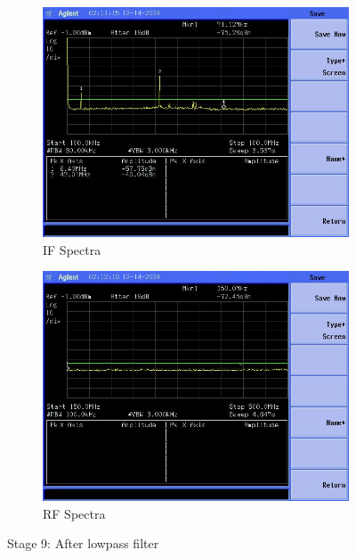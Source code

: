 \documentclass[letterpaper,12pt]{article}
\begin{document}
\begin{figure}[H]
	\begin{subfigure}[t]{.49\textwidth}
		\centering
		\includegraphics[width=\linewidth]{figures/receiver_spectra/9.lpf.lower}
		\caption{IF Spectra}
	  \end{subfigure}
	  \hfill
	  \begin{subfigure}[t]{.49\textwidth}
		\centering
		\includegraphics[width=\linewidth]{figures/receiver_spectra/9.lpf.upper}
		\caption{RF Spectra}
	  \end{subfigure}

	  \vspace{0.5cm}
	  \caption{Stage 9: After lowpass filter}
\end{figure}
\end{document}
